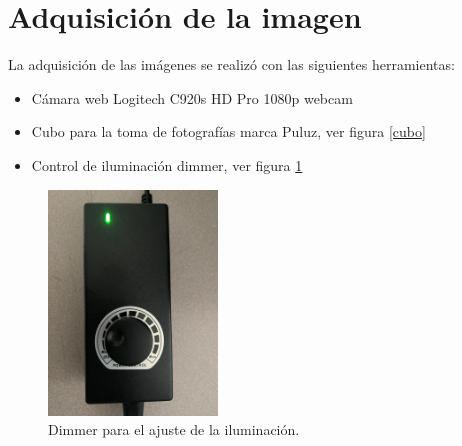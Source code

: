 \documentclass[a4paper, 11pt]{article}
\begin{document}














\section{Adquisición de la imagen}

La adquisición de las imágenes se realizó con las siguientes herramientas:

\begin{itemize}
\item Cámara web Logitech C920s HD Pro 1080p webcam 
\item Cubo para la toma de fotografías marca Puluz, ver figura \ref{cubo}
\item Control de iluminación dimmer, ver figura \ref{dimmer}
\end{itemize}

\begin{figure}[ht]
\centering
\includegraphics[width=0.4\textwidth]{dimer1}
\caption{Dimmer para el ajuste de la iluminación.}
\label{dimmer}
\end{figure}
\end{document}
